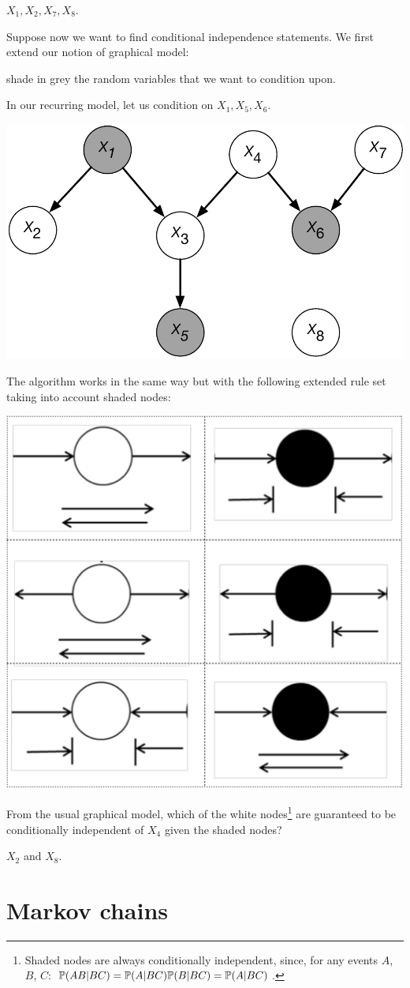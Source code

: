 \documentclass{article}
\begin{document}
 $X_1, X_2, X_7, X_8$.

 Suppose now we want to find conditional independence statements. We first extend our notion of graphical model:

 shade in grey the random variables that we want to condition upon.

 In our recurring model, let us condition on $X_1, X_5, X_6$.
\begin{center}
	\includegraphics[width=0.5\linewidth]{figures/graph-model-cond} 
\end{center}

 The algorithm works in the same way but with the following extended rule set taking into account shaded nodes:
\begin{center}
	\includegraphics[width=0.4\linewidth]{figures/bayes-ball-full-rules} 
\end{center}

 From the usual graphical model, which of the white nodes\footnote{Shaded nodes are always conditionally independent, since, for any events $A$, $B$, $C$: $\P(AB|BC) = \P(A|BC)\P(B|BC) = \P(A|BC)$.} are guaranteed to be conditionally independent of $X_4$ given the shaded nodes?

 $X_2$ and $X_8$.


\section{Markov chains}
\end{document}
